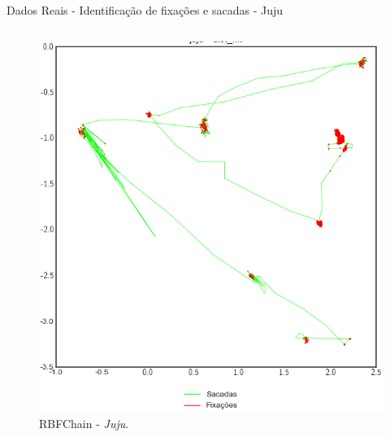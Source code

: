 \documentclass[10pt]{beamer}
\begin{document}
\begin{frame}{Dados Reais - Identificação de fixações e sacadas -  Juju}
\begin{columns}
\begin{column}{0.48\textwidth}
\begin{figure}[H]
\begin{center}
                    \includegraphics[scale=0.28]{imagens/juju_rbfchain.png}
                    \caption{RBFChain - \textit{Juju}.}
                \end{center}
            \end{figure}
        \end{column}
    \end{columns}
\end{frame}
\end{document}
